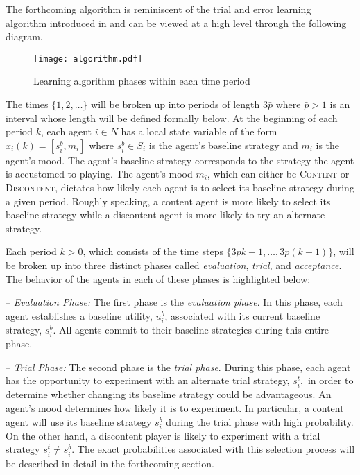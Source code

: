 The forthcoming algorithm is reminiscent of the trial and error learning algorithm introduced in \cite{Young2009} and can be viewed at a high level through the following diagram.
%
\begin{figure}[H]
\begin{center}
\texttt{[image: algorithm.pdf]}
\caption{Learning algorithm phases within each time period}
\end{center}
\end{figure}
%
The times $\{1, 2, \dots\}$ will be broken up into periods of length $3 \bar{p}$ where $\bar{p} > 1$ is an interval whose length will be defined formally below.  At the beginning of each period $k$, each agent $i \in N$ has a local state variable of the form $x_i(k) = [s_i^b, m_i]$ where $s_i^b \in S_i$ is the agent's baseline strategy and $m_i$ is the agent's mood.  The agent's baseline strategy corresponds to the strategy the agent is accustomed to playing.  The agent's mood $m_i$, which can either be \textsc{Content} or \textsc{Discontent}, dictates how likely each agent is to select its baseline strategy during a given period.  Roughly speaking, a content agent is more likely to select its baseline strategy while a discontent agent is more likely to try an alternate strategy.  

Each period $k > 0$, which consists of the time steps $\{3 \bar{p} k + 1, \dots, 3 \bar{p} (k + 1)\}$, will be broken up into three distinct phases called \emph{evaluation}, \emph{trial}, and \emph{acceptance}.  The behavior of the agents in each of these phases is highlighted below:
%

\vspace{.1cm}
%
\noindent -- \emph{Evaluation Phase:} The first phase is the \emph{evaluation phase}. In this phase, each agent  establishes a baseline utility, $u_i^b$, associated with its current baseline strategy, $s_i^b.$ All agents commit to their baseline strategies during this entire phase.

\vspace{.1cm}
%
\noindent -- \emph{Trial Phase:} The second phase is the \emph{trial phase}. During this phase, each agent has the opportunity to experiment with an alternate trial strategy, $s_i^t,$ in order to determine whether changing its baseline strategy could be advantageous. An agent's mood determines how likely it is to experiment.  In particular, a content agent will use its baseline strategy $s_i^b$ during the trial phase with high probability.  On the other hand, a discontent player is likely to experiment with a trial strategy $s_i^t \neq s_i^b$.  The exact probabilities associated with this selection process will be described in detail in the forthcoming section.   

